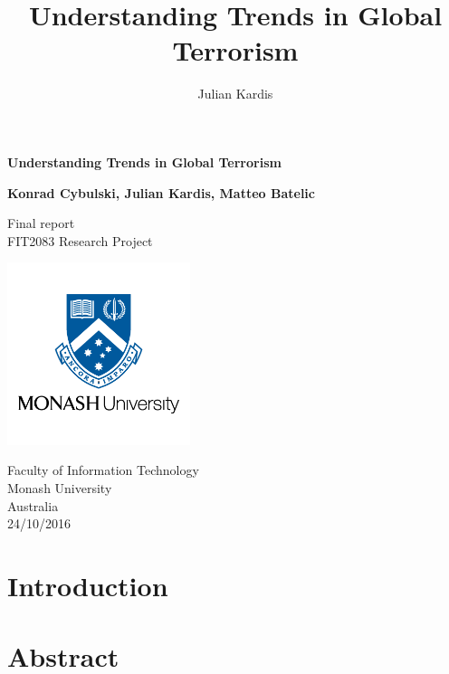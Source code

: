 \documentclass[10pt,a4paper]{article}
\author{Julian Kardis}
\title{Understanding Trends in Global Terrorism}
\begin{document}
\begin{titlepage}
    \begin{center}
        \vspace*{1cm}
        
        \LARGE
        \textbf{Understanding Trends in Global Terrorism}
        
        \vspace{4cm}
        
		\Large 
        
        \textbf{Konrad Cybulski, Julian Kardis, Matteo Batelic}
        
        
        \LARGE
        \vspace{2cm}

        
        
        \vfill
        
        
        
        Final report \\
        FIT2083 Research Project
        
        
        \includegraphics[width=0.4\textwidth]{monash-university-logo.png}
              
        
        \large
        Faculty of Information Technology\\
        Monash University\\
        Australia\\
        24/10/2016
        
    \end{center}
\end{titlepage}

\pagebreak
\tableofcontents
\pagebreak



\section{Introduction} 
\section{Abstract} 
\end{document}
